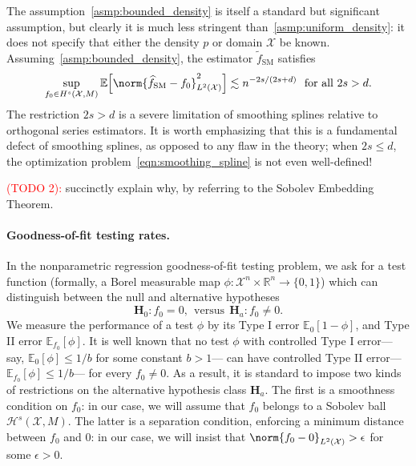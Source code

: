 \documentclass{article}
\newcommand{\Reals}{\mathbb{R}}
\newcommand{\1}{\mathbf{1}}
\newcommand{\Xset}{\mathcal{X}}
\newcommand{\Leb}{L}
\newcommand{\mc}[1]{\mathcal{#1}}
\newcommand{\Ebb}{\mathbb{E}}
\newcommand{\wt}[1]{\widetilde{#1}}
\newcommand{\wh}[1]{\widehat{#1}}
\newcommand{\SM}{\mathrm{SM}}
\theoremstyle{alden}
\theoremstyle{aldenthm}
\theoremstyle{definition}
\theoremstyle{remark}
\begin{document}
The assumption~\ref{asmp:bounded_density} is itself a standard but significant assumption, but clearly it is much less stringent than~\ref{asmp:uniform_density}: it does not specify that either the density $p$ or domain $\Xset$ be known.
Assuming~\ref{asmp:bounded_density}, the estimator $\wt{f}_{\SM}$ satisfies
\begin{equation*}
\sup_{f_0 \in H^s(\Xset,M)}\Ebb\Bigl[\norm{\wh{f}_{\SM} - f_0}_{L^2(\Xset)}^2\Bigr]  \lesssim n^{-2s/(2s + d)}~~\textrm{for all $2s > d$.}
\end{equation*}
The restriction $2s > d$ is a severe limitation of smoothing splines relative to  orthogonal series estimators. It is worth emphasizing that this is a fundamental defect of smoothing splines, as opposed to any flaw in the theory; when $2s \leq d$, the optimization problem~\eqref{eqn:smoothing_spline} is not even well-defined!

\textcolor{red}{(TODO 2):} succinctly explain why, by referring to the Sobolev Embedding Theorem.

\paragraph{Goodness-of-fit testing rates.} 

In the nonparametric regression goodness-of-fit testing problem, we ask for a test function (formally, a Borel measurable map $\phi: \mc{X}^n \times \Reals^n \to \{0,1\}$) which can distinguish between the null and alternative hypotheses
\begin{equation}
\mathbf{H}_0: f_0 = 0, ~~\textrm{versus}~~ \mathbf{H}_a: f_0 \neq 0.
\end{equation}
We measure the performance of a test $\phi$ by its Type I error $\Ebb_0[1 - \phi]$, and Type II error $\mathbb{E}_{f_0}[\phi]$. It is well known that no test $\phi$ with controlled Type I error---say, $\Ebb_0[\phi] \leq 1/b$ for some constant $b > 1$---
can have controlled Type II error---$\Ebb_{f_0}[\phi] \leq 1/b$--- for every $f_0 \neq 0$. As a result, it is standard to impose two kinds of restrictions on the alternative hypothesis class $\mathbf{H}_a$. The first is a smoothness condition on $f_0$: in our case, we will assume that $f_0$ belongs to a Sobolev ball $\mc{H}^s(\Xset,M)$. The latter is a separation condition, enforcing a minimum distance between $f_0$ and $0$: in our case, we will insist that $\norm{f_0  - 0}_{\Leb^2(\Xset)} > \epsilon$ for some $\epsilon > 0$.
\end{document}
